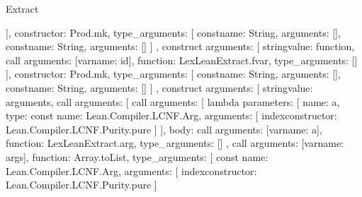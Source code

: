\begin{lexlean}{Extract}
\begin{toolingmodule}
{{{{{{{{                        }
                      ],
                      constructor: Prod.mk,
                      type_arguments: [
                        const{name: String, arguments: []},
                        const{name: String, arguments: []}
                      ]
                    },
                    construct{
                      arguments: [
                        string{value: function},
                        call{
                          arguments: [var{name: id}],
                          function: LexLeanExtract.fvar,
                          type_arguments: []
                        }
                      ],
                      constructor: Prod.mk,
                      type_arguments: [
                        const{name: String, arguments: []},
                        const{name: String, arguments: []}
                      ]
                    },
                    construct{
                      arguments: [
                        string{value: arguments},
                        call{
                          arguments: [
                            call{
                              arguments: [
                                lambda{
                                  parameters: [
                                    {
                                      name: a,
                                      type: const{
                                        name: Lean.Compiler.LCNF.Arg,
                                        arguments: [
                                          index{constructor: Lean.Compiler.LCNF.Purity.pure}
                                        ]
                                      }
                                    }
                                  ],
                                  body: call{
                                    arguments: [var{name: a}],
                                    function: LexLeanExtract.arg,
                                    type_arguments: []
                                  }
                                },
                                call{
                                  arguments: [var{name: args}],
                                  function: Array.toList,
                                  type_arguments: [
                                    const{
                                      name: Lean.Compiler.LCNF.Arg,
                                      arguments: [
                                        index{constructor: Lean.Compiler.LCNF.Purity.pure}
                                      ]
                                    }
}}}}}}}}}}
\end{toolingmodule}
\end{lexlean}
